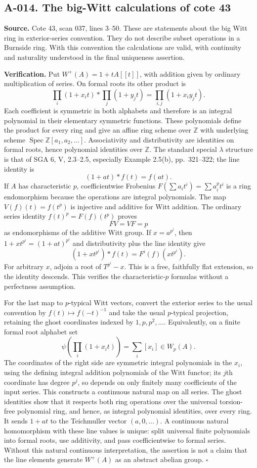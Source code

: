 \subsection*{A-014. The big-Witt calculations of cote 43}
\textbf{Source.} Cote 43, scan 037, lines 3--50. These are statements
about the big Witt ring in exterior-series convention. They do not
describe subset operations in a Burnside ring. With this convention
the calculations are valid, with continuity and naturality understood
in the final uniqueness assertion.

\textbf{Verification.} Put $W^+(A)=1+tA[[t]]$, with addition given
by ordinary multiplication of series. On formal roots its other
product is
\[
 \prod_i(1+x_it)*\prod_j(1+y_jt)=\prod_{i,j}(1+x_iy_jt).
\]
Each coefficient is symmetric in both alphabets and therefore is
an integral polynomial in their elementary symmetric functions.
These polynomials define the product for every ring and give an
affine ring scheme over $\mathbb Z$ with underlying scheme
$\operatorname{Spec}\mathbb Z[a_1,a_2,\ldots]$. Associativity and
distributivity are identities on formal roots, hence polynomial
identities over $\mathbb Z$. The standard special $\lambda$
structure is that of SGA 6, V, 2.3--2.5, especially Example 2.5(b), pp.~321--322; the line identity is
\[
 (1+at)*f(t)=f(at).
\]
If $A$ has characteristic $p$, coefficientwise Frobenius
$F(\sum a_it^i)=\sum a_i^pt^i$ is a ring endomorphism because
the operations are integral polynomials. The map $V(f)(t)=f(t^p)$
is injective and additive for Witt addition. The ordinary series
identity $f(t)^p=F(f)(t^p)$ proves
\[
 FV=VF=p
\]
as endomorphisms of the additive Witt group. If $x=a^{p^i}$, then
$1+xt^{p^i}=(1+at)^{p^i}$ and distributivity plus the line identity
give
\[
 (1+xt^{p^i})*f(t)=F^i(f)(xt^{p^i}).
\]
For arbitrary $x$, adjoin a root of $T^{p^i}-x$. This is a free,
faithfully flat extension, so the identity descends. This verifies
the characteristic-$p$ formulas without a perfectness assumption.

For the last map to $p$-typical Witt vectors, convert the exterior
series to the usual convention by $f(t)\mapsto f(-t)^{-1}$ and
take the usual $p$-typical projection, retaining the ghost coordinates
indexed by $1,p,p^2,\ldots$. Equivalently, on a finite formal root
alphabet set
\[
 \psi\left(\prod_i(1+x_it)\right)=\sum_i[x_i]\in W_p(A).
\]
The coordinates of the right side are symmetric integral
polynomials in the $x_i$, using the defining integral addition
polynomials of the Witt functor; its $j$th coordinate has degree
$p^j$, so depends on only finitely many coefficients of the input
series. This constructs a continuous natural map on all series.
The ghost identities show that it respects both ring operations
over the universal torsion-free polynomial ring, and hence, as
integral polynomial identities, over every ring. It sends
$1+at$ to the Teichmuller vector $(a,0,\ldots)$. A continuous
natural homomorphism with these line values is unique: split
universal finite polynomials into formal roots, use additivity,
and pass coefficientwise to formal series. Without this natural
continuous interpretation, the assertion is not a claim that the
line elements generate $W^+(A)$ as an abstract abelian group.
\hfill$\square$

